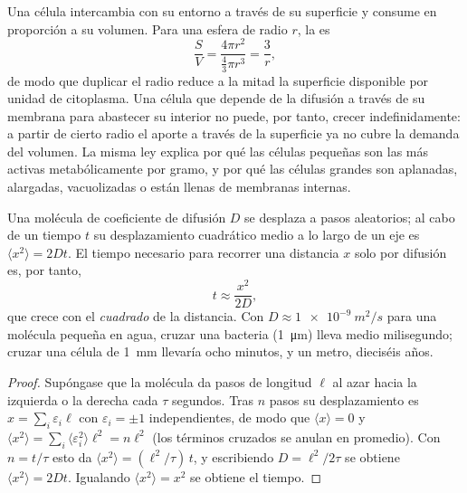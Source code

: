 \begin{proposition}\label{prop:b2:unicellular-diversity:surface}
Una célula intercambia con su entorno a través de su superficie y
consume en proporción a su volumen. Para una esfera de radio $r$, la
\emph{} es
\[
\frac{S}{V} = \frac{4\pi r^2}{\tfrac{4}{3}\pi r^3} = \frac{3}{r},
\]
de modo que duplicar el radio reduce a la mitad la superficie disponible
por unidad de citoplasma. Una célula que depende de la difusión a través
de su membrana para abastecer su interior no puede, por tanto, crecer
indefinidamente: a partir de cierto radio el aporte a través de la
superficie ya no cubre la demanda del volumen. La misma ley explica por
qué las células pequeñas son las más activas metabólicamente por gramo, y
por qué las células grandes son aplanadas, alargadas, vacuolizadas o
están llenas de membranas internas.
\end{proposition}

\begin{theorem}\label{thm:b2:unicellular-diversity:diffusion}
Una molécula de coeficiente de difusión $D$ se desplaza a pasos
aleatorios; al cabo de un tiempo $t$ su desplazamiento cuadrático medio
a lo largo de un eje es $\langle x^2\rangle = 2Dt$. El tiempo necesario
para recorrer una distancia $x$ solo por difusión es, por tanto,
\[
t \approx \frac{x^2}{2D},
\]
que crece con el \emph{cuadrado} de la distancia. Con
$D \approx \qty{1e-9}{m^2/s}$ para una molécula pequeña en agua, cruzar
una bacteria (\qty{1}{\micro m}) lleva medio milisegundo; cruzar una
célula de \qty{1}{mm} llevaría ocho minutos, y un metro, dieciséis
años.
\end{theorem}
\begin{proof}
Supóngase que la molécula da pasos de longitud $\ell$ al azar hacia la
izquierda o la derecha cada $\tau$ segundos. Tras $n$ pasos su
desplazamiento es $x = \sum_i \varepsilon_i \ell$ con $\varepsilon_i = \pm 1$
independientes, de modo que $\langle x\rangle = 0$ y $\langle x^2\rangle =
\sum_i \langle\varepsilon_i^2\rangle \ell^2 = n\ell^2$ (los términos
cruzados se anulan en promedio). Con $n = t/\tau$ esto da $\langle x^2\rangle
= (\ell^2/\tau)\,t$, y escribiendo $D = \ell^2/2\tau$ se obtiene
$\langle x^2\rangle = 2Dt$. Igualando $\langle x^2\rangle = x^2$ se
obtiene el tiempo.
\end{proof}

